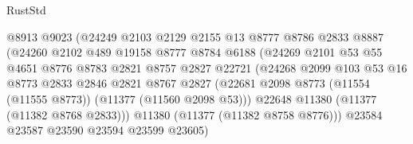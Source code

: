 \begin{lexlean}{RustStd}
\begin{coremodule}
                                  @8913
                                  @9023
                                  (@24249
                                    @2103
                                    @2129
                                    @2155
                                    @13
                                    @8777
                                    @8786
                                    @2833
                                    @8887
                                    (@24260
                                      @2102
                                      @489
                                      @19158
                                      @8777
                                      @8784
                                      @6188
                                      (@24269
                                        @2101
                                        @53
                                        @55
                                        @4651
                                        @8776
                                        @8783
                                        @2821
                                        @8757
                                        @2827
                                        @22721
                                        (@24268
                                          @2099
                                          @103
                                          @53
                                          @16
                                          @8773
                                          @2833
                                          @2846
                                          @2821
                                          @8767
                                          @2827
                                          (@22681
                                            @2098
                                            @8773
                                            (@11554 (@11555 @8773))
                                            (@11377 (@11560 @2098 @53)))
                                          @22648
                                          @11380
                                          (@11377 (@11382 @8768 @2833)))
                                        @11380
                                        (@11377 (@11382 @8758 @8776)))
                                      @23584
                                      @23587
                                      @23590
                                      @23594
                                      @23599
                                      @23605)

\end{coremodule}
\end{lexlean}
